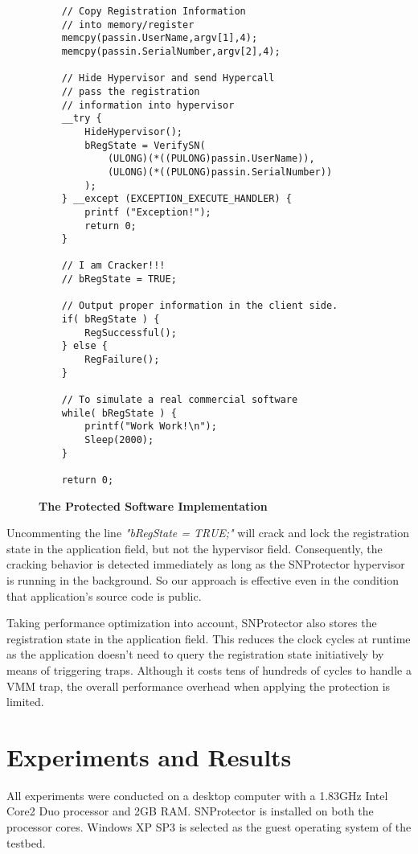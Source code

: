 \documentclass[conference]{IEEEtran}
\begin{document}
{\begin{figure}[!htb]
\begin{lstlisting}
    // Copy Registration Information
    // into memory/register
    memcpy(passin.UserName,argv[1],4);
    memcpy(passin.SerialNumber,argv[2],4);

    // Hide Hypervisor and send Hypercall
    // pass the registration
    // information into hypervisor
    __try {
        HideHypervisor();
        bRegState = VerifySN(
            (ULONG)(*((PULONG)passin.UserName)),
            (ULONG)(*((PULONG)passin.SerialNumber))
        );
    } __except (EXCEPTION_EXECUTE_HANDLER) {
        printf ("Exception!");
        return 0;
    }

    // I am Cracker!!!
    // bRegState = TRUE;

    // Output proper information in the client side.
    if( bRegState ) {
        RegSuccessful();
    } else {
        RegFailure();
    }

    // To simulate a real commercial software
    while( bRegState ) {
        printf("Work Work!\n");
        Sleep(2000);
    }

    return 0;
\end{lstlisting}
\caption{{\bf The Protected Software Implementation}}
\label{Figure 10.}
\end{figure}

Uncommenting the line \emph{"bRegState = TRUE;"} will crack and
lock the registration state in the application field, but not the
hypervisor field. Consequently, the cracking behavior is detected
immediately as long as the SNProtector hypervisor is running in
the background. So our approach is effective even in the condition
that application's source code is public.

Taking performance optimization into account, SNProtector also
stores the registration state in the application field. This
reduces the clock cycles at runtime as the application doesn't
need to query the registration state initiatively by means of
triggering traps. Although it costs tens of hundreds of cycles to
handle a VMM trap, the overall performance overhead when applying
the protection is limited.

\bigskip

\section{Experiments and Results}
All experiments were conducted on a desktop computer with a
1.83GHz Intel Core2 Duo processor and 2GB RAM. SNProtector is
installed on both the processor cores. Windows XP SP3 is selected
as the guest operating system of the testbed.

}
\end{document}
